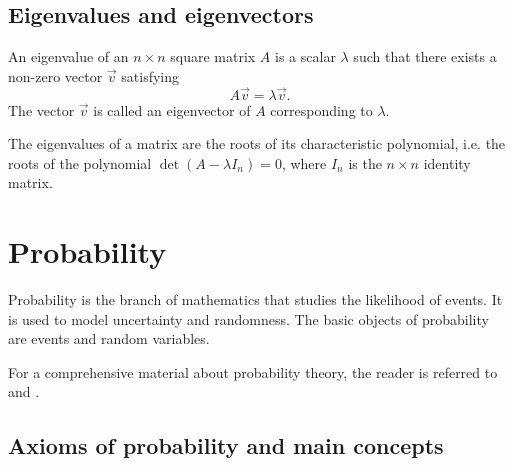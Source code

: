%

\subsection{Eigenvalues and eigenvectors}

An eigenvalue of an $n \times n$ square matrix $A$ is a scalar $\lambda$ such that there exists a
non-zero vector $\vec{v}$ satisfying
\begin{equation}
  \label{eq:eig}
  A \vec{v} = \lambda \vec{v}\text{.}
\end{equation}
The vector $\vec{v}$ is called an eigenvector of $A$ corresponding to $\lambda$.

The eigenvalues of a matrix are the roots of its characteristic polynomial, i.e. the
roots of the polynomial $\det(A - \lambda I_n) = 0$, where $I_n$ is the $n \times n$ identity matrix.

\section{Probability}

Probability is the branch of mathematics that studies the likelihood of events.  It is
used to model uncertainty and randomness.  The basic objects of probability are events
and random variables.

For a comprehensive material about probability theory, the reader is referred to
\textcite{Ross2019} and \textcite{Ross2023}.

\subsection{Axioms of probability and main concepts}

